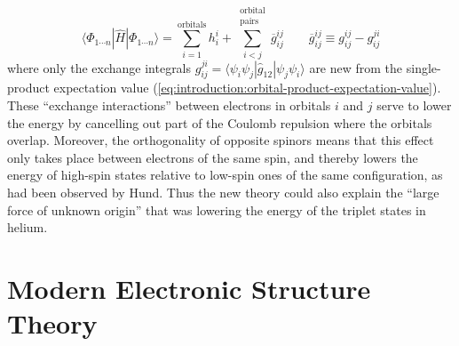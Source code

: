 \begin{equation}
    \label{eq:introduction:determinant-expectation-value}
    \langle \Phi_{1\cdots n}|
    \hat{H}
    |\Phi_{1\cdots n} \rangle
    =
    \sum_{i=1}^\mathrm{orbitals}
    h_i^i
    +
    \sum_{i<j}^{\substack{\mathrm{orbital}\\\mathrm{pairs}}}
    \overline{g}_{ij}^{ij}
    \qquad
    \overline{g}_{ij}^{ij}
    \equiv
    g_{ij}^{ij}
    -
    g_{ij}^{ji}
\end{equation}
where only the exchange integrals
\(
    g_{ij}^{ji}
    =
    \langle \psi_i\psi_j|\hat{g}_{12}|\psi_j\psi_i\rangle
\)
are new from the single-product expectation value
(\cref{eq:introduction:orbital-product-expectation-value}).
These ``exchange interactions'' between electrons in orbitals \(i\) and \(j\)
serve to lower the energy by cancelling out part of the Coulomb repulsion where
the orbitals overlap.
Moreover, the orthogonality of opposite spinors means that this effect only
takes place between electrons of the same spin, and thereby lowers the energy of
high-spin states relative to low-spin ones of the same configuration, as had
been observed by Hund.\cite{Hund:1925p345}
Thus the new theory could also explain the ``large force of unknown
origin''\cite{Mehra:1982} that was lowering the energy of the triplet states in
helium.


\section{Modern Electronic Structure Theory}

